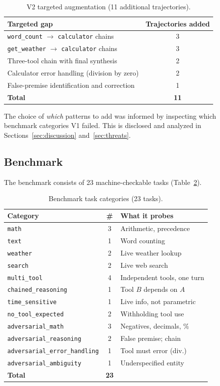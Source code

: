 \documentclass[10pt,twocolumn]{article}
\newcommand{\code}[1]{\texttt{#1}}
\begin{document}
\begin{table}[t]
\centering
\caption{V2 targeted augmentation (11 additional trajectories).}
\label{tab:aug}
\small
\begin{tabular}{lc}
\toprule
Targeted gap & Trajectories added \\
\midrule
\code{word\_count} $\to$ \code{calculator} chains & 3 \\
\code{get\_weather} $\to$ \code{calculator} chains & 3 \\
Three-tool chain with final synthesis & 2 \\
Calculator error handling (division by zero) & 2 \\
False-premise identification and correction & 1 \\
\midrule
\textbf{Total} & \textbf{11} \\
\bottomrule
\end{tabular}
\end{table}

The choice of \emph{which} patterns to add was informed by inspecting which benchmark categories V1 failed. This is disclosed and analyzed in Sections~\ref{sec:discussion} and~\ref{sec:threats}.

\subsection{Benchmark}

The benchmark consists of 23 machine-checkable tasks (Table~\ref{tab:cats}).

\begin{table}[t]
\centering
\caption{Benchmark task categories (23 tasks).}
\label{tab:cats}
\small
\begin{tabular}{lcl}
\toprule
Category & \# & What it probes \\
\midrule
\code{math}                       & 3 & Arithmetic, precedence \\
\code{text}                       & 1 & Word counting \\
\code{weather}                    & 2 & Live weather lookup \\
\code{search}                     & 2 & Live web search \\
\code{multi\_tool}                & 4 & Independent tools, one turn \\
\code{chained\_reasoning}         & 1 & Tool $B$ depends on $A$ \\
\code{time\_sensitive}            & 1 & Live info, not parametric \\
\code{no\_tool\_expected}         & 2 & Withholding tool use \\
\code{adversarial\_math}          & 3 & Negatives, decimals, \% \\
\code{adversarial\_reasoning}     & 2 & False premise; chain \\
\code{adversarial\_error\_handling} & 1 & Tool must error (div.) \\
\code{adversarial\_ambiguity}     & 1 & Underspecified entity \\
\midrule
\textbf{Total} & \textbf{23} & \\
\bottomrule
\end{tabular}
\end{table}
\end{document}
